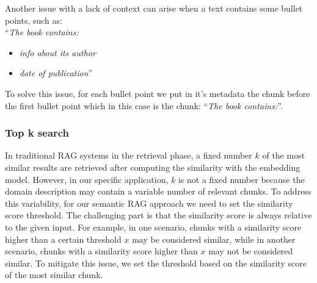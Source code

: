 Another issue with a lack of context can arise when a text contains some bullet points, such as: \\

\noindent{}``\textit{The book contains:}
\begin{itemize}
\item \textit{info about its author}
\item \textit{date of publication}'' \\
\end{itemize}

\noindent{}To solve this issue, for each bullet point we put in it's metadata the chunk before the first bullet point which in this case is the chunk: ``\textit{The book contains:}''.



 


\subsubsection{Top k search}
\label{sec:top_k_search}

In traditional RAG systems in the retrieval phase, a fixed number $k$ of the most similar results are retrieved after computing the similarity with the embedding model. However, in our specific application, $k$ is not a fixed number because the domain description may contain a variable number of relevant chunks. To address this variability, for our semantic RAG approach we need to set the similarity score threshold. The challenging part is that the similarity score is always relative to the given input. For example, in one scenario, chunks with a similarity score higher than a certain threshold $x$ may be considered similar, while in another scenario, chunks with a similarity score higher than $x$ may not be considered similar. To mitigate this issue, we set the threshold based on the similarity score of the most similar chunk.